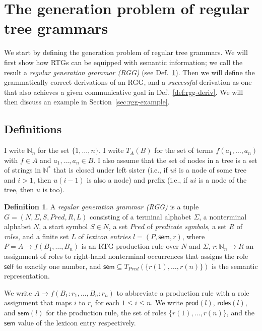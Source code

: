 \documentclass[11pt,a4]{article}
\def\N{\mathbb{N}}
\newcommand{\sem}{\mathsf{sem}}
\newcommand{\self}{\mathsf{self}}
\newcommand{\produ}{\mathsf{prod}}
\newcommand{\roles}{\mathsf{roles}}
\newcommand{\Neq}{{:}}
\theoremstyle{plain}
\theoremstyle{definition}
\newtheorem{definition}[theorem]{Definition}
\begin{document}
\section{The generation problem of regular tree grammars}
\label{sec:gener-probl-regul}

We start by defining the generation problem of regular tree
grammars. We will first show how RTGs can be equipped with semantic
information; we call the result a \emph{regular generation grammar
  (RGG)} (see Def.~\ref{def:rgg}). Then we will define the
grammatically correct derivations of an RGG, and a \emph{successful}
derivation as one that also achieves a given communicative goal in
Def.~\ref{def:rgg-deriv}. We will then discuss an example in
Section~\ref{sec:rgg-example}.


\subsection{Definitions}

I write $\N_n$ for the set $\{1,\ldots,n\}$.  I write $T_A(B)$ for the
set of terms $f(a_1,\ldots,a_n)$ with $f \in A$ and $a_1,\ldots,a_n
\in B$.  I also assume that the set of nodes in a tree is a set of
strings in $\N^*$ that is closed under left sister (i.e., if $ui$ is a
node of some tree and $i>1$, then $u(i-1)$ is also a node) and prefix
(i.e., if $ui$ is a node of the tree, then $u$ is too).

\begin{definition} \label{def:rgg}
  A \emph{regular generation grammar (RGG)} is a tuple $G =
  (N,\Sigma,S,Pred,R,L)$ consisting of a terminal alphabet $\Sigma$, a
  nonterminal alphabet $N$, a start symbol $S \in N$, a set $Pred$ of
  \emph{predicate symbols}, a set $R$ of \emph{roles}, and a finite
  set $L$ of \emph{lexicon entries} $l = (P,\sem,r)$, where $P = A
  \rightarrow f(B_1,\ldots,B_n)$ is an RTG production rule over $N$
  and $\Sigma$, $r:\N_n \rightarrow R$ an assignment of roles to
  right-hand nonterminal occurrences that assigns the role $\self$ to
  exactly one number, and $\sem \subseteq
  T_{Pred}(\{r(1),\ldots,r(n)\})$ is the semantic representation.
\end{definition}

We write $A \rightarrow f(B_1\Neq r_1,\ldots,B_n \Neq r_n)$ to
abbreviate a production rule with a role assignment that maps $i$ to
$r_i$ for each $1 \leq i \leq n$. We write $\produ(l)$, $\roles(l)$,
and $\sem(l)$ for the production rule, the set of roles
$\{r(1),\ldots,r(n)\}$, and the $\sem$ value of the lexicon entry
respectively.
\end{document}
